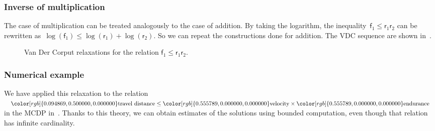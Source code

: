 \documentclass[twocolumn,english]{IEEEconf}
\theoremstyle{plain}
\theoremstyle{definition}
\theoremstyle{definition}
\theoremstyle{plain}
\newcommand{\aword}[1]{\mathsf{#1}}
\newcommand{\vmath}[1]{\aword{#1}}
\newcommand{\fun}{\vmath{f}}
\newcommand{\res}{\vmath{r}}
\newcommand{\colR}{\color[rgb]{0.555789,0.000000,0.000000}}
\newcommand{\colF}{\color[rgb]{0.094869,0.500000,0.000000}}
\begin{document}
\subsubsection{Inverse of multiplication}

The case of multiplication can be treated analogously to the case
of addition. By taking the logarithm, the inequality~$\fun_{1}\leq\res_{1}\res_{2}$
can be rewritten as~$\log(\fun_{1})\leq\log(\res_{1})+\log(\res_{2}).$
So we can repeat the constructions done for addition. The VDC sequence
are shown in~.

\begin{figure}[H]
\begin{centering}
\par\end{centering}
\caption{\label{fig:approx_invmult}Van Der Corput relaxations for the relation
$\fun_{1}\leq\res_{1}\res_{2}$.}
\end{figure}


\subsubsection{Numerical example}

We have applied this relaxation to the relation ${\colF\text{travel distance}}\leq{\colR\text{velocity}}\times{\colR\text{endurance}}$
in the MCDP in~. Thanks to this theory,
we can obtain estimates of the solutions using bounded computation,
even though that relation has infinite cardinality.
\end{document}
